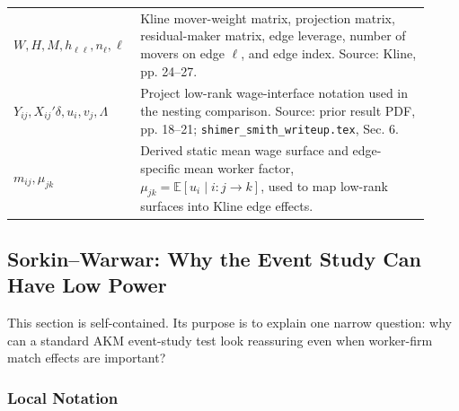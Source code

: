 ﻿\documentclass[11pt]{article}
\newcommand{\E}{\mathbb{E}}
\newcommand{\1}{\mathbf{1}}
\begin{document}
\begin{longtable}{>{\raggedright\arraybackslash}p{0.24\linewidth}
                >{\raggedright\arraybackslash}p{0.68\linewidth}}
$W,H,M,h_{\ell\ell},n_\ell,\ell$ & Kline mover-weight matrix, projection matrix, residual-maker matrix, edge leverage, number of movers on edge $\ell$, and edge index. Source: Kline, pp. 24--27. \\
$Y_{ij},X_{ij}'\delta,u_i,v_j,\Lambda$ & Project low-rank wage-interface notation used in the nesting comparison. Source: prior result PDF, pp. 18--21; \texttt{shimer\_smith\_writeup.tex}, Sec. 6. \\
$m_{ij},\mu_{jk}$ & Derived static mean wage surface and edge-specific mean worker factor, $\mu_{jk}=\E[u_i\mid i:j\to k]$, used to map low-rank surfaces into Kline edge effects. \\
\bottomrule
\end{longtable}

\subsection{Sorkin--Warwar: Why the Event Study Can Have Low Power}

This section is self-contained. Its purpose is to explain one narrow question:
why can a standard AKM event-study test look reassuring even when worker-firm
match effects are important?

\subsubsection{Local Notation}
\end{document}
